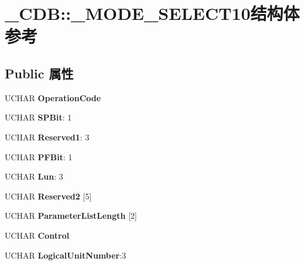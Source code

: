 \hypertarget{struct___c_d_b_1_1___m_o_d_e___s_e_l_e_c_t10}{}\section{\+\_\+\+C\+DB\+:\+:\+\_\+\+M\+O\+D\+E\+\_\+\+S\+E\+L\+E\+C\+T10结构体 参考}
\label{struct___c_d_b_1_1___m_o_d_e___s_e_l_e_c_t10}
\subsection*{Public 属性}
\begin{DoxyCompactItemize}
\item 
\mbox{\label{struct___c_d_b_1_1___m_o_d_e___s_e_l_e_c_t10_aeec581d7cdd1e29478db13c490cfd453}} 
U\+C\+H\+AR {\bfseries Operation\+Code}
\item 
\mbox{\label{struct___c_d_b_1_1___m_o_d_e___s_e_l_e_c_t10_acc5609cb144121c8a8d62a516b2003c0}} 
U\+C\+H\+AR {\bfseries S\+P\+Bit}\+: 1
\item 
\mbox{\label{struct___c_d_b_1_1___m_o_d_e___s_e_l_e_c_t10_a4c26ce7c7977f0b009ec4d0613e10d09}} 
U\+C\+H\+AR {\bfseries Reserved1}\+: 3
\item 
\mbox{\label{struct___c_d_b_1_1___m_o_d_e___s_e_l_e_c_t10_a40370e0785269597efb021db13ef5efe}} 
U\+C\+H\+AR {\bfseries P\+F\+Bit}\+: 1
\item 
\mbox{\label{struct___c_d_b_1_1___m_o_d_e___s_e_l_e_c_t10_a65216a9d038544c34142c5e0ca283e42}} 
U\+C\+H\+AR {\bfseries Lun}\+: 3
\item 
\mbox{\label{struct___c_d_b_1_1___m_o_d_e___s_e_l_e_c_t10_ac49c91461bc459f85af04f617ce9abc5}} 
U\+C\+H\+AR {\bfseries Reserved2} \mbox{[}5\mbox{]}
\item 
\mbox{\label{struct___c_d_b_1_1___m_o_d_e___s_e_l_e_c_t10_aedeca3edbe304c1cf6bb2a155ddfebc6}} 
U\+C\+H\+AR {\bfseries Parameter\+List\+Length} \mbox{[}2\mbox{]}
\item 
\mbox{\label{struct___c_d_b_1_1___m_o_d_e___s_e_l_e_c_t10_a29ed4cbcc269d2c25dc06e34ac90134d}} 
U\+C\+H\+AR {\bfseries Control}
\item 
\mbox{\label{struct___c_d_b_1_1___m_o_d_e___s_e_l_e_c_t10_ab0003e1baa11afdf4ca52fbf38fbeb5f}} 
U\+C\+H\+AR {\bfseries Logical\+Unit\+Number}\+:3
\end{DoxyCompactItemize}


